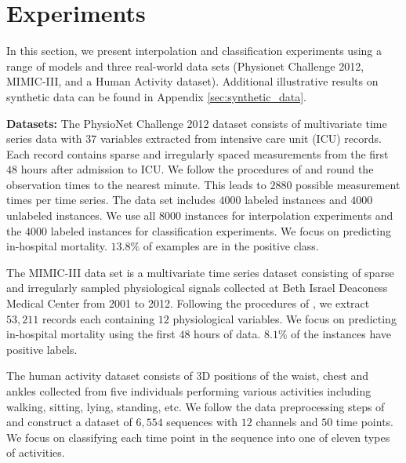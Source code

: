 \vspace{-2em}
\section{Experiments}
In this section, we present interpolation and classification experiments using a range of models and three real-world data sets (Physionet Challenge 2012, MIMIC-III, and a Human Activity dataset). Additional illustrative results on synthetic data can be found in Appendix \ref{sec:synthetic_data}. 

\textbf{Datasets:} The PhysioNet Challenge 2012 dataset \citep{physionet} consists of multivariate time series data with $37$ variables extracted from intensive care unit (ICU) records. Each record contains sparse and irregularly spaced measurements from the first $48$ hours after admission to ICU. We follow the procedures of \citet{Rubanova2019} and round the observation times to the nearest minute. This leads to $2880$ possible measurement times per time series. The data set includes $4000$ labeled instances and $4000$ unlabeled instances.  We use all $8000$ instances for interpolation experiments and the $4000$ labeled instances for classification experiments. We focus on predicting in-hospital mortality. $13.8\%$ of examples are in the positive class.

The MIMIC-III data set \citep{johnson2016mimic} is a multivariate time series dataset consisting of sparse and irregularly sampled physiological signals collected at Beth Israel Deaconess Medical Center from 2001 to 2012. Following the procedures  of \citet{shukla2019}, we extract $53,211$ records each containing $12$ physiological variables. We focus on predicting in-hospital mortality using the first $48$ hours of data. $8.1\%$ of the instances have positive labels.


The human activity dataset consists of 3D positions of the waist, chest and ankles collected from five individuals performing various activities including walking, sitting, lying, standing, etc. We follow the data preprocessing steps of \citet{Rubanova2019} and construct a dataset of $6,554$ sequences with $12$ channels and $50$ time points.  We focus on classifying each time point in the sequence into one of eleven types of activities. 





